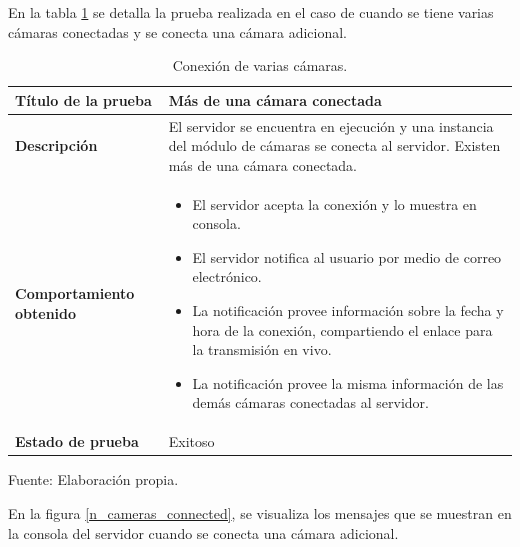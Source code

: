 En la tabla \ref{many_cameras_connected_table} se detalla la prueba realizada en el caso de cuando se tiene varias cámaras conectadas y se conecta una cámara adicional.\\

\begin{table}[H]
    \caption{Conexión de varias cámaras.}
    \begin{center}
        \begin{tabular}{|>{\centering}p{}|m{}<{\centering}|} 
            \hline
            \textbf{Título de la prueba} & \textbf{ Más de una cámara conectada} \\
            \hline
            \textbf{Descripción} & El servidor se encuentra en ejecución y una instancia del módulo de cámaras se conecta al servidor. Existen más de una cámara conectada.\\
            \hline
            \textbf{Comportamiento obtenido} & 
            \begin{itemize}
                \item El servidor acepta la conexión y lo muestra en consola.
                \item El servidor notifica al usuario por medio de correo electrónico.
                \item La notificación provee información sobre la fecha y hora de la conexión, compartiendo el enlace para la transmisión en vivo.
                \item La notificación provee la misma información de las demás cámaras conectadas al servidor.
            \end{itemize} \\ 
            \hline
            \textbf{Estado de prueba} & Exitoso \\
            \hline
        \end{tabular}
        \label{many_cameras_connected_table}
        \begin{center}
            Fuente: Elaboración propia.
        \end{center}
    \end{center}
\end{table}

En la figura \ref{n_cameras_connected}, se visualiza los mensajes que se muestran en la consola del servidor cuando se conecta una cámara adicional.

